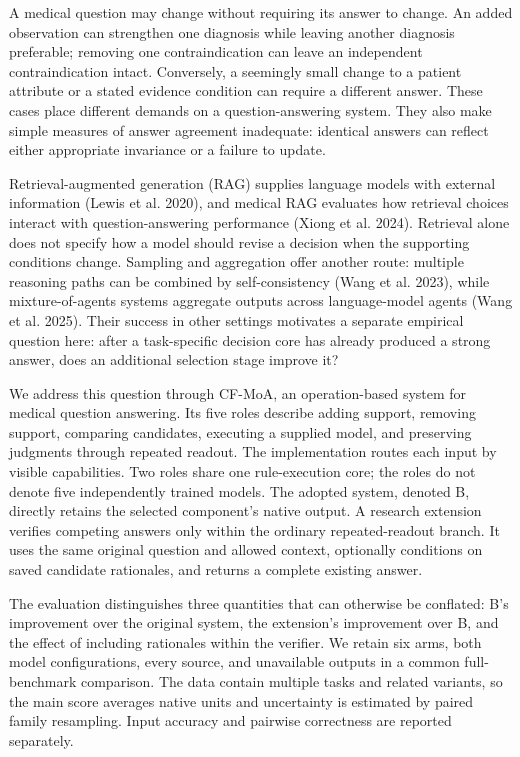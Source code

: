 \documentclass[
  english,
  11pt,
]{article}
\begin{document}
A medical question may change without requiring its answer to change. An
added observation can strengthen one diagnosis while leaving another
diagnosis preferable; removing one contraindication can leave an
independent contraindication intact. Conversely, a seemingly small
change to a patient attribute or a stated evidence condition can require
a different answer. These cases place different demands on a
question-answering system. They also make simple measures of answer
agreement inadequate: identical answers can reflect either appropriate
invariance or a failure to update.

Retrieval-augmented generation (RAG) supplies language models with
external information (Lewis et al. 2020), and medical RAG evaluates how
retrieval choices interact with question-answering performance (Xiong et
al. 2024). Retrieval alone does not specify how a model should revise a
decision when the supporting conditions change. Sampling and aggregation
offer another route: multiple reasoning paths can be combined by
self-consistency (Wang et al. 2023), while mixture-of-agents systems
aggregate outputs across language-model agents (Wang et al. 2025). Their
success in other settings motivates a separate empirical question here:
after a task-specific decision core has already produced a strong
answer, does an additional selection stage improve it?

We address this question through CF-MoA, an operation-based system for
medical question answering. Its five roles describe adding support,
removing support, comparing candidates, executing a supplied model, and
preserving judgments through repeated readout. The implementation routes
each input by visible capabilities. Two roles share one rule-execution
core; the roles do not denote five independently trained models. The
adopted system, denoted B, directly retains the selected component's
native output. A research extension verifies competing answers only
within the ordinary repeated-readout branch. It uses the same original
question and allowed context, optionally conditions on saved candidate
rationales, and returns a complete existing answer.

The evaluation distinguishes three quantities that can otherwise be
conflated: B's improvement over the original system, the extension's
improvement over B, and the effect of including rationales within the
verifier. We retain six arms, both model configurations, every source,
and unavailable outputs in a common full-benchmark comparison. The data
contain multiple tasks and related variants, so the main score averages
native units and uncertainty is estimated by paired family resampling.
Input accuracy and pairwise correctness are reported separately.
\end{document}
